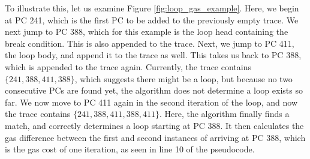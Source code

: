 To illustrate this, let us examine Figure \ref{fig:loop_gas_example}. Here, we begin at PC 241,
which is the first PC to be added to the previously empty trace. We next jump to PC 388, which
for this example is the loop head containing the break condition. This is also appended to the trace.
Next, we jump to PC 411, the loop body,  and append it to the trace as well. This takes us back to
PC 388, which is appended to the trace again. Currently, the trace contains $\{241, 388, 411, 388\}$,
which suggests there might be a loop, but because no two consecutive PCs are found yet, the algorithm
does not determine a loop exists so far. We now move to PC 411 again in the second iteration of the loop,
and now the trace contains $\{241, 388, 411, 388, 411\}$. Here, the algorithm finally finds a match, and 
correctly determines a loop starting at PC 388. It then calculates the gas difference between the first and 
second instances of arriving at PC 388, which is the gas cost of one iteration, as seen in line 10
of the pseudocode. 

